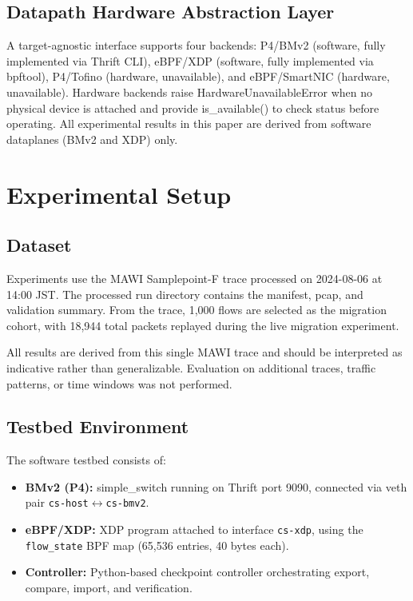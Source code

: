 \documentclass[10pt, conference]{IEEEtran}
\begin{document}
\subsection{Datapath Hardware Abstraction Layer}
\label{subsec:hal}
A target-agnostic interface supports four backends: P4/BMv2 (software, fully implemented via Thrift CLI), eBPF/XDP (software, fully implemented via bpftool), P4/Tofino (hardware, unavailable), and eBPF/SmartNIC (hardware, unavailable). Hardware backends raise HardwareUnavailableError when no physical device is attached and provide is\_available() to check status before operating. All experimental results in this paper are derived from software dataplanes (BMv2 and XDP) only.

\section{Experimental Setup}
\label{sec:experimental_setup}

\subsection{Dataset}
\label{subsec:dataset}
Experiments use the MAWI Samplepoint-F trace processed on 2024-08-06 at 14:00 JST. The processed run directory contains the manifest, pcap, and validation summary. From the trace, 1{,}000 flows are selected as the migration cohort, with 18{,}944 total packets replayed during the live migration experiment.

All results are derived from this single MAWI trace and should be interpreted as indicative rather than generalizable. Evaluation on additional traces, traffic patterns, or time windows was not performed.

\subsection{Testbed Environment}
\label{subsec:testbed}
The software testbed consists of:
\begin{itemize}
    \item \textbf{BMv2 (P4):} simple\_switch running on Thrift port 9090, connected via veth pair \texttt{cs-host}$\leftrightarrow$\texttt{cs-bmv2}.
    \item \textbf{eBPF/XDP:} XDP program attached to interface \texttt{cs-xdp}, using the \texttt{flow\_state} BPF map (65{,}536 entries, 40 bytes each).
    \item \textbf{Controller:} Python-based checkpoint controller orchestrating export, compare, import, and verification.
\end{itemize}
\end{document}
